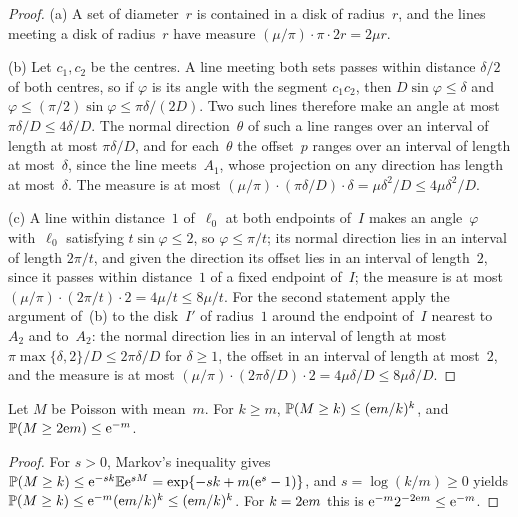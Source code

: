 \documentclass[11pt,letterpaper]{article}
\begin{document}
\begin{proof}
(a) A set of diameter~$r$ is contained in a disk of radius~$r$, and the lines meeting a disk of radius~$r$ have measure $(\mu/\pi)\cdot\pi\cdot2r=2\mu r$.

(b) Let $c_1,c_2$ be the centres. A line meeting both sets passes within distance $\delta/2$ of both centres, so if $\varphi$ is its angle with the segment $c_1c_2$, then $D\sin\varphi\le\delta$ and $\varphi\le(\pi/2)\sin\varphi\le\pi\delta/(2D)$. Two such lines therefore make an angle at most $\pi\delta/D\le4\delta/D$. The normal direction~$\theta$ of such a line ranges over an interval of length at most $\pi\delta/D$, and for each~$\theta$ the offset~$p$ ranges over an interval of length at most~$\delta$, since the line meets~$A_1$, whose projection on any direction has length at most~$\delta$. The measure is at most $(\mu/\pi)\cdot(\pi\delta/D)\cdot\delta=\mu\delta^2/D\le4\mu\delta^2/D$.

(c) A line within distance~$1$ of~$\ell_0$ at both endpoints of~$I$ makes an angle~$\varphi$ with~$\ell_0$ satisfying $t\sin\varphi\le2$, so $\varphi\le\pi/t$; its normal direction lies in an interval of length $2\pi/t$, and given the direction its offset lies in an interval of length~$2$, since it passes within distance~$1$ of a fixed endpoint of~$I$; the measure is at most $(\mu/\pi)\cdot(2\pi/t)\cdot2=4\mu/t\le8\mu/t$. For the second statement apply the argument of~(b) to the disk~$I'$ of radius~$1$ around the endpoint of~$I$ nearest to~$A_2$ and to~$A_2$: the normal direction lies in an interval of length at most $\pi\max\{\delta,2\}/D\le2\pi\delta/D$ for $\delta\ge1$, the offset in an interval of length at most~$2$, and the measure is at most $(\mu/\pi)\cdot(2\pi\delta/D)\cdot2=4\mu\delta/D\le8\mu\delta/D$.
\end{proof}

\begin{lemma}
\label{lem:poisson}
Let $M$ be Poisson with mean~$m$. For $k\ge m$, $\mathbb P(M\ge k)\le(\mathrm{e} m/k)^k$, and $\mathbb P(M\ge2\mathrm{e} m)\le\mathrm{e}^{-m}$.
\end{lemma}

\begin{proof}
For $s>0$, Markov's inequality gives $\mathbb P(M\ge k)\le\mathrm{e}^{-sk}\mathbb E\mathrm{e}^{sM}=\exp\{-sk+m(\mathrm{e}^s-1)\}$, and $s=\log(k/m)\ge0$ yields $\mathbb P(M\ge k)\le\mathrm{e}^{-m}(\mathrm{e} m/k)^k\le(\mathrm{e} m/k)^k$. For $k=2\mathrm{e} m$ this is $\mathrm{e}^{-m}2^{-2\mathrm{e} m}\le\mathrm{e}^{-m}$.
\end{proof}
\end{document}

